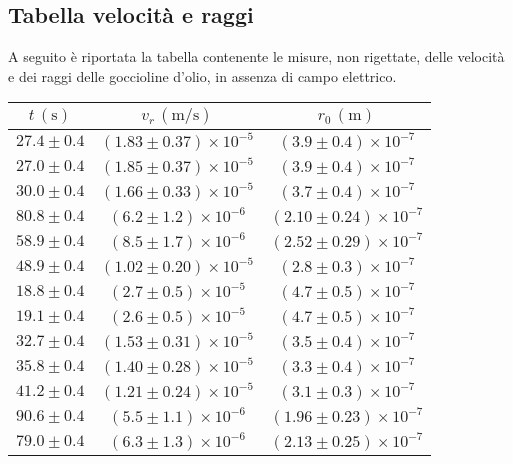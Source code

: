 \subsection{Tabella velocità e raggi}
A seguito è riportata la tabella contenente le misure, non rigettate, delle velocità e dei raggi delle goccioline d'olio, in assenza di campo elettrico.        \renewcommand{\arraystretch}{1.3} %
        \begin{longtable}[C]{|c|c|c|}
            \hline
            $t \, (\mathrm{s})$ & $v_r \, (\mathrm{m/s})$ & $r_0 \, (\mathrm{m})$ \\
            \hline
            $27.4 \pm 0.4$ & $(1.83 \pm 0.37) \times 10^{-5}$ & $(3.9 \pm 0.4) \times 10^{-7}$ \\
            \hline
            $27.0 \pm 0.4$ & $(1.85 \pm 0.37) \times 10^{-5}$ & $(3.9 \pm 0.4) \times 10^{-7}$ \\
            \hline
            $30.0 \pm 0.4$ & $(1.66 \pm 0.33) \times 10^{-5}$ & $(3.7 \pm 0.4) \times 10^{-7}$ \\
            \hline
            $80.8 \pm 0.4$ & $(6.2 \pm 1.2) \times 10^{-6}$ & $(2.10 \pm 0.24) \times 10^{-7}$ \\
            \hline
            $58.9 \pm 0.4$ & $(8.5 \pm 1.7) \times 10^{-6}$ & $(2.52 \pm 0.29) \times 10^{-7}$ \\
            \hline
            $48.9 \pm 0.4$ & $(1.02 \pm 0.20) \times 10^{-5}$ & $(2.8 \pm 0.3) \times 10^{-7}$ \\
            \hline
            $18.8 \pm 0.4$ & $(2.7 \pm 0.5) \times 10^{-5}$ & $(4.7 \pm 0.5) \times 10^{-7}$ \\
            \hline
            $19.1 \pm 0.4$ & $(2.6 \pm 0.5) \times 10^{-5}$ & $(4.7 \pm 0.5) \times 10^{-7}$ \\
            \hline
            $32.7 \pm 0.4$ & $(1.53 \pm 0.31) \times 10^{-5}$ & $(3.5 \pm 0.4) \times 10^{-7}$ \\
            \hline
            $35.8 \pm 0.4$ & $(1.40 \pm 0.28) \times 10^{-5}$ & $(3.3 \pm 0.4) \times 10^{-7}$ \\
            \hline
            $41.2 \pm 0.4$ & $(1.21 \pm 0.24) \times 10^{-5}$ & $(3.1 \pm 0.3) \times 10^{-7}$ \\
            \hline
            $90.6 \pm 0.4$ & $(5.5 \pm 1.1) \times 10^{-6}$ & $(1.96 \pm 0.23) \times 10^{-7}$ \\
            \hline
            $79.0 \pm 0.4$ & $(6.3 \pm 1.3) \times 10^{-6}$ & $(2.13 \pm 0.25) \times 10^{-7}$ \\

\end{longtable}
